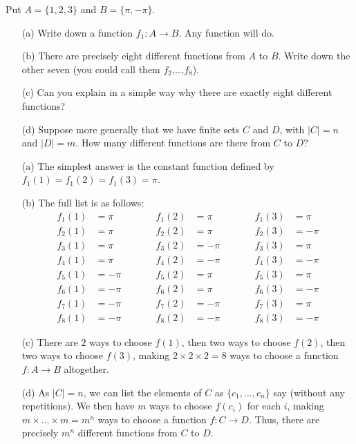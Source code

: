 \documentclass[a4paper]{book}
\newcommand{\tm}        {\times}
\newcommand{\xra}       {\xrightarrow}
\renewcommand{\:}{\colon}
\theoremstyle{definition}
\newenvironment{starex}{
 \renewcommand{\thetheorem}{\arabic{chapter}.\arabic{section}.\arabic{theorem}${}^*$}
 \exercise
}{\endexercise}
\renewenvironment{solution}{\SolutionInline}{\endSolutionInline}
\begin{document}
\begin{starex}
 Put $A=\{1,2,3\}$ and $B=\{\pi,-\pi\}$.
 \begin{itemize}
  \item[(a)] Write down a function $f_1\:A\xra{}B$.  Any function will
   do.
  \item[(b)] There are precisely eight different functions from $A$ to
   $B$.  Write down the other seven (you could call them
   $f_2$,\ldots,$f_8$).
  \item[(c)] Can you explain in a simple way why there are exactly
   eight different functions?
  \item[(d)] Suppose more generally that we have finite sets $C$ and
   $D$, with $|C|=n$ and $|D|=m$.  How many different functions are
   there from $C$ to $D$?
 \end{itemize}
\end{starex}
\begin{solution}
 \begin{itemize}
  \item[(a)] The simplest answer is the constant function defined by
   $f_1(1)=f_1(2)=f_1(3)=\pi$.
  \item[(b)] The full list is as follows:
   \[ \begin{array}{rlcrlcrl}
       f_1(1)&= \pi &\qquad& f_1(2)&= \pi &\qquad& f_1(3)&= \pi \\
       f_2(1)&= \pi &      & f_2(2)&= \pi &      & f_2(3)&=-\pi \\
       f_3(1)&= \pi &      & f_3(2)&=-\pi &      & f_3(3)&= \pi \\
       f_4(1)&= \pi &      & f_4(2)&=-\pi &      & f_4(3)&=-\pi \\
       f_5(1)&=-\pi &      & f_5(2)&= \pi &      & f_5(3)&= \pi \\
       f_6(1)&=-\pi &      & f_6(2)&= \pi &      & f_6(3)&=-\pi \\
       f_7(1)&=-\pi &      & f_7(2)&=-\pi &      & f_7(3)&= \pi \\
       f_8(1)&=-\pi &      & f_8(2)&=-\pi &      & f_8(3)&=-\pi
      \end{array}
   \]
  \item[(c)] There are $2$ ways to choose $f(1)$, then two ways to
   choose $f(2)$, then two ways to choose $f(3)$, making
   $2\tm 2\tm 2=8$ ways to choose a function $f\:A\xra{}B$
   altogether.
  \item[(d)] As $|C|=n$, we can list the elements of $C$ as
   $\{c_1,\ldots,c_n\}$ say (without any repetitions).  We then have
   $m$ ways to choose $f(c_i)$ for each $i$, making
   $m\tm\ldots\tm m=m^n$ ways to choose a function $f\:C\xra{}D$.
   Thus, there are precisely $m^n$ different functions from $C$ to
   $D$.
 \end{itemize}
\end{solution}
\end{document}
